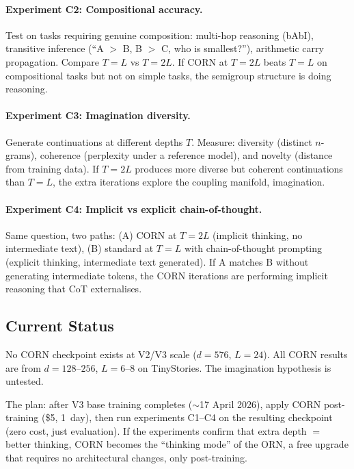 \documentclass[11pt, a4paper]{article}
\theoremstyle{plain}
\theoremstyle{definition}
\theoremstyle{remark}
\begin{document}
\paragraph{Experiment C2: Compositional accuracy.}
Test on tasks requiring genuine composition: multi-hop reasoning (bAbI), transitive inference (``A $>$ B, B $>$ C, who is smallest?''), arithmetic carry propagation.
Compare $T{=}L$ vs $T{=}2L$.
If CORN at $T{=}2L$ beats $T{=}L$ on compositional tasks but not on simple tasks, the semigroup structure is doing reasoning.

\paragraph{Experiment C3: Imagination diversity.}
Generate continuations at different depths $T$.
Measure: diversity (distinct $n$-grams), coherence (perplexity under a reference model), and novelty (distance from training data).
If $T{=}2L$ produces more diverse but coherent continuations than $T{=}L$, the extra iterations explore the coupling manifold, imagination.

\paragraph{Experiment C4: Implicit vs explicit chain-of-thought.}
Same question, two paths: (A) CORN at $T{=}2L$ (implicit thinking, no intermediate text), (B) standard at $T{=}L$ with chain-of-thought prompting (explicit thinking, intermediate text generated).
If A matches B without generating intermediate tokens, the CORN iterations are performing implicit reasoning that CoT externalises.

\subsection{Current Status}

No CORN checkpoint exists at V2/V3 scale ($d{=}576$, $L{=}24$).
All CORN results are from $d{=}128$--$256$, $L{=}6$--$8$ on TinyStories.
The imagination hypothesis is untested.

The plan: after V3 base training completes ($\sim$17 April 2026), apply CORN post-training (\$5, 1~day), then run experiments C1--C4 on the resulting checkpoint (zero cost, just evaluation).
If the experiments confirm that extra depth $=$ better thinking, CORN becomes the ``thinking mode'' of the ORN, a free upgrade that requires no architectural changes, only post-training.
\end{document}
